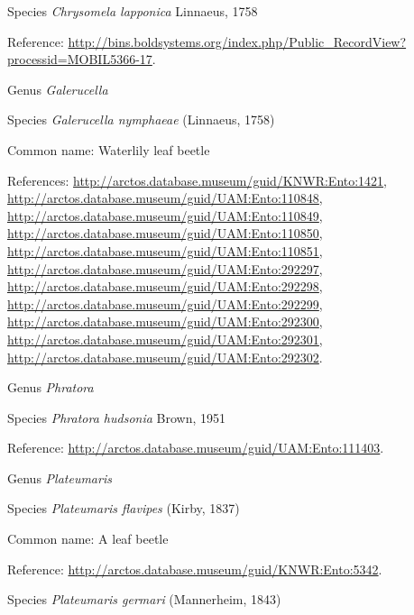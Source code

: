 \documentclass[9pt, article]{memoir}
\begin{document}
\begin{multicols}{2}
\vspace{6pt}\noindent\hspace{36pt}Species \textit{Chrysomela lapponica} Linnaeus, 1758


Reference: 
\url{http://bins.boldsystems.org/index.php/Public_RecordView?processid=MOBIL5366-17}.

\vspace{6pt}\noindent\hspace{30pt}Genus \textit{Galerucella}


\vspace{6pt}\noindent\hspace{36pt}Species \textit{Galerucella nymphaeae} (Linnaeus, 1758)


Common name: Waterlily leaf beetle

References: 
\url{http://arctos.database.museum/guid/KNWR:Ento:1421}, 
\url{http://arctos.database.museum/guid/UAM:Ento:110848}, 
\url{http://arctos.database.museum/guid/UAM:Ento:110849}, 
\url{http://arctos.database.museum/guid/UAM:Ento:110850}, 
\url{http://arctos.database.museum/guid/UAM:Ento:110851}, 
\url{http://arctos.database.museum/guid/UAM:Ento:292297}, 
\url{http://arctos.database.museum/guid/UAM:Ento:292298}, 
\url{http://arctos.database.museum/guid/UAM:Ento:292299}, 
\url{http://arctos.database.museum/guid/UAM:Ento:292300}, 
\url{http://arctos.database.museum/guid/UAM:Ento:292301}, 
\url{http://arctos.database.museum/guid/UAM:Ento:292302}.

\vspace{6pt}\noindent\hspace{30pt}Genus \textit{Phratora}


\vspace{6pt}\noindent\hspace{36pt}Species \textit{Phratora hudsonia} Brown, 1951


Reference: 
\url{http://arctos.database.museum/guid/UAM:Ento:111403}.

\vspace{6pt}\noindent\hspace{30pt}Genus \textit{Plateumaris}


\vspace{6pt}\noindent\hspace{36pt}Species \textit{Plateumaris flavipes} (Kirby, 1837)


Common name: A leaf beetle

Reference: 
\url{http://arctos.database.museum/guid/KNWR:Ento:5342}.

\vspace{6pt}\noindent\hspace{36pt}Species \textit{Plateumaris germari} (Mannerheim, 1843)



\end{multicols}
\end{document}
